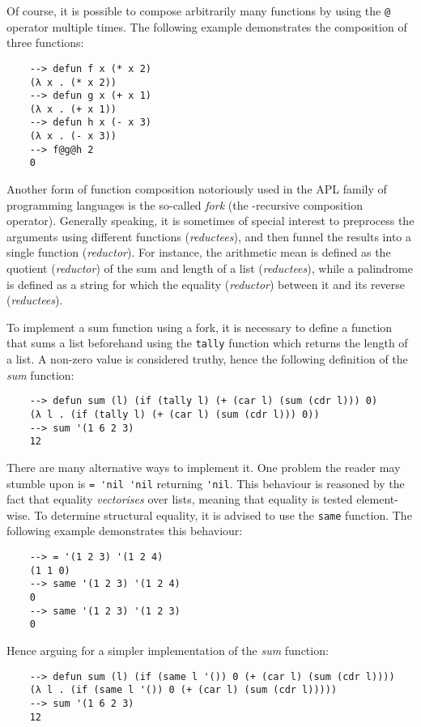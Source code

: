 Of course, it is possible to compose arbitrarily many functions by using the \verb|@| operator multiple times. The following example demonstrates the composition of three functions:

\begin{Verbatim}
    --> defun f x (* x 2)
    (λ x . (* x 2))
    --> defun g x (+ x 1)
    (λ x . (+ x 1))
    --> defun h x (- x 3)
    (λ x . (- x 3))
    --> f@g@h 2
    0
\end{Verbatim}

Another form of function composition notoriously used in the APL family of programming languages is the so-called \textit{fork} (the \mu-recursive composition operator). Generally speaking, it is sometimes of special interest to preprocess the arguments using different functions (\textit{reductees}), and then funnel the results into a single function (\textit{reductor}). For instance, the arithmetic mean is defined as the quotient (\textit{reductor}) of the sum and length of a list (\textit{reductees}), while a palindrome is defined as a string for which the equality (\textit{reductor}) between it and its reverse (\textit{reductees}).

To implement a sum function using a fork, it is necessary to define a function that sums a list beforehand using the \verb|tally| function which returns the length of a list. A non-zero value is considered truthy, hence the following definition of the \textit{sum} function:

\begin{Verbatim}
    --> defun sum (l) (if (tally l) (+ (car l) (sum (cdr l))) 0)
    (λ l . (if (tally l) (+ (car l) (sum (cdr l))) 0))
    --> sum '(1 6 2 3)
    12
\end{Verbatim}

There are many alternative ways to implement it. One problem the reader may stumble upon is \verb|= 'nil 'nil| returning \verb|'nil|. This behaviour is reasoned by the fact that equality \textit{vectorises} over lists, meaning that equality is tested element-wise. To determine structural equality, it is advised to use the \verb|same| function. The following example demonstrates this behaviour:

\begin{Verbatim}
    --> = '(1 2 3) '(1 2 4)
    (1 1 0)
    --> same '(1 2 3) '(1 2 4)
    0
    --> same '(1 2 3) '(1 2 3)
    0
\end{Verbatim}

Hence arguing for a simpler implementation of the \textit{sum} function:
\begin{Verbatim}
    --> defun sum (l) (if (same l '()) 0 (+ (car l) (sum (cdr l))))
    (λ l . (if (same l '()) 0 (+ (car l) (sum (cdr l)))))
    --> sum '(1 6 2 3)
    12
\end{Verbatim}

